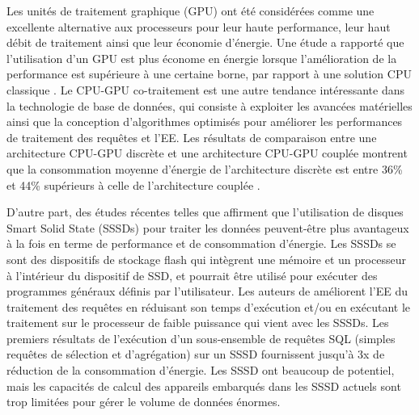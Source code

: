 Les unités de traitement graphique (GPU) ont été considérées comme une excellente alternative aux processeurs pour leur haute performance, leur haut débit de traitement ainsi que leur économie d'énergie. Une étude a rapporté que l'utilisation d'un GPU est plus économe en énergie lorsque l'amélioration de la performance est supérieure à une certaine borne, par rapport à une solution CPU classique \cite{Rofouei08}. Le CPU-GPU co-traitement est une autre tendance intéressante dans la technologie de base de données, qui consiste à exploiter les avancées matérielles ainsi que la conception d'algorithmes optimisés pour améliorer les performances de traitement des requêtes et l'EE. Les résultats de comparaison entre une architecture CPU-GPU discrète et une architecture CPU-GPU couplée montrent que la consommation moyenne d'énergie de l'architecture discrète est entre 36\% et 44\% supérieurs à celle de l'architecture couplée \cite{Hurson16}.

D'autre part, des études récentes telles que \cite{Do13} affirment que l'utilisation de disques Smart Solid State (SSSDs) pour traiter les données peuvent-être plus avantageux à la fois en terme de performance et de consommation d'énergie. Les SSSDs se sont des dispositifs de stockage flash qui intègrent une mémoire et un processeur à l'intérieur du dispositif de SSD, et pourrait être utilisé pour exécuter des programmes généraux définis par l'utilisateur. Les auteurs de \cite{Do13} améliorent l'EE du traitement des requêtes en réduisant son temps d'exécution et/ou en exécutant le traitement sur le processeur de faible puissance qui vient avec les SSSDs. Les premiers résultats de l'exécution d'un sous-ensemble de requêtes SQL (simples requêtes de sélection et d'agrégation) sur un SSSD fournissent jusqu'à 3x de réduction de la consommation d'énergie. Les SSSD ont beaucoup de potentiel, mais les capacités de calcul des appareils embarqués dans les SSSD actuels sont trop limitées pour gérer le volume de données énormes.

